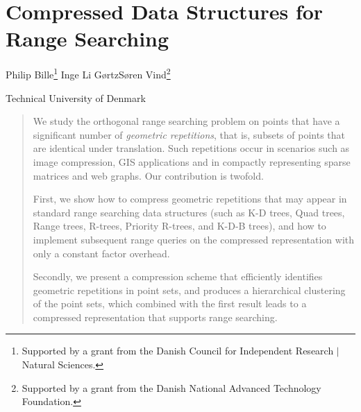 \chapter{Compressed Data Structures for Range Searching}\label{chp:compressedrangesearching}

\begin{infosection}
    \begin{authors}
        Philip Bille\footnote{Supported by a grant from the Danish Council for Independent Research $\vert$ Natural Sciences.} \qquad Inge Li G{\o}rtz\samethanks \qquad S{\o}ren Vind\footnote{Supported by a grant from the Danish National Advanced Technology Foundation.}
    \end{authors}

    \begin{uninames}
        Technical University of Denmark
    \end{uninames}

    \begin{abstract}
    We study the orthogonal range searching problem on points that have a significant number of \emph{geometric repetitions}, that is, subsets of points that are identical under translation. Such repetitions occur in scenarios such as image compression, GIS applications and in compactly representing sparse matrices and web graphs. Our contribution is twofold. 
    
    First, we show how to compress geometric repetitions that may appear in standard range searching data structures (such as K-D trees, Quad trees, Range trees, R-trees, Priority R-trees, and K-D-B trees), and how to implement subsequent range queries on the compressed representation with only a constant factor overhead. 
    
    Secondly, we present a compression scheme that efficiently identifies geometric repetitions in point sets, and produces a hierarchical clustering of the point sets, which combined with the first result leads to a compressed representation that supports range searching. 
    \end{abstract}
\end{infosection}


